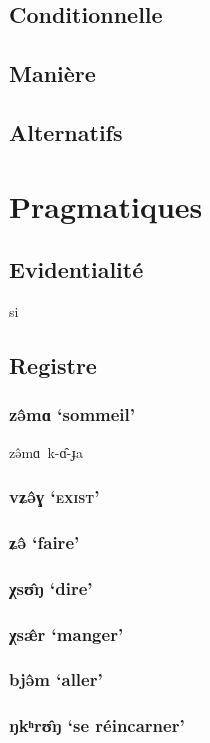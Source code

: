 \documentclass[11pt, a4paper]{book}              %
\newcommand{\ipa}[1]{{\phon \mbox{#1}}} %
\begin{document}
\section{Conditionnelle}

\section{Manière}

\section{Alternatifs}


\chapter{Pragmatiques}
\section{Evidentialité}

\ipa{si}



\section{Registre}
\subsection{\ipa{zə̂mɑ} `sommeil'}
\ipa{zə̂mɑ k-ɑ̂-ɟa}
\subsection{\ipa{vʑə̂ɣ} `\textsc{exist}'}
\subsection{\ipa{ʑə̂} `faire'}
\subsection{\ipa{χsʊ̂ŋ} `dire'}
\subsection{\ipa{χsæ̂r} `manger'}
\subsection{\ipa{bjə̂m} `aller'}
\subsection{\ipa{ŋkʰrʊ̂ŋ} `se réincarner'}
\end{document}
